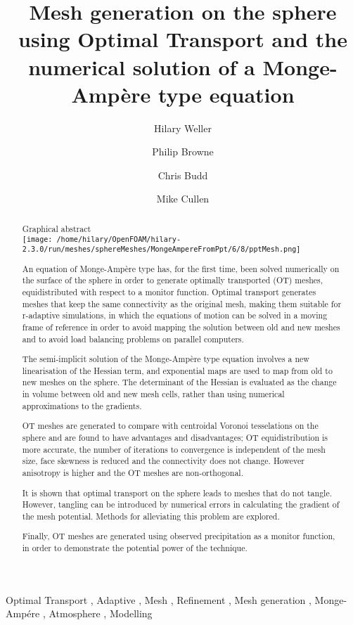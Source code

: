 \begin{frontmatter}

\title{Mesh generation on the sphere using Optimal Transport and the numerical solution of a Monge-Amp\`ere type equation}

\author[label1]{Hilary Weller}
\author[label1]{Philip Browne}
\author[label2]{Chris Budd}
\author[label3]{Mike Cullen}
\address[label1]{Meteorology, University of Reading, UK}
\address[label2]{University of Bath, UK}
\address[label3]{Met Office, UK}

\begin{abstract}

Graphical abstract\\
\texttt{[image: /home/hilary/OpenFOAM/hilary-2.3.0/run/meshes/sphereMeshes/MongeAmpereFromPpt/6/8/pptMesh.png]}

An equation of Monge-Amp\`ere type has, for the first time, been solved numerically on the surface of the sphere in order to generate optimally transported (OT) meshes, equidistributed with respect to a monitor function. Optimal transport generates meshes that keep the same connectivity as the original mesh, making them suitable for r-adaptive simulations, in which the equations of motion can be solved in a moving frame of reference in order to avoid mapping the solution between old and new meshes and to avoid load balancing problems on parallel computers. 

The semi-implicit solution of the Monge-Amp\`ere type equation involves a new linearisation of the Hessian term, and exponential maps are used to map from old to new meshes on the sphere. The determinant of the Hessian is evaluated as the change in volume between old and new mesh cells, rather than using numerical approximations to the gradients. 

OT meshes are generated to compare with centroidal Voronoi tesselations on the sphere and are found to have advantages and disadvantages; OT equidistribution is more accurate, the number of iterations to convergence is independent of the mesh size, face skewness is reduced and the connectivity does not change. However anisotropy is higher and the OT meshes are non-orthogonal.

It is shown that optimal transport on the sphere leads to meshes that do not tangle. However, tangling can be introduced by numerical errors in calculating the gradient of the mesh potential. Methods for alleviating this problem are explored. 

Finally, OT meshes are generated using observed precipitation as a monitor function, in order to demonstrate the potential power of the technique.


\end{abstract}

\begin{keyword}
Optimal Transport \sep
Adaptive \sep
Mesh \sep
Refinement \sep
Mesh generation \sep
Monge-Amp\'ere \sep
Atmosphere \sep
Modelling
\end{keyword}

\end{frontmatter}

